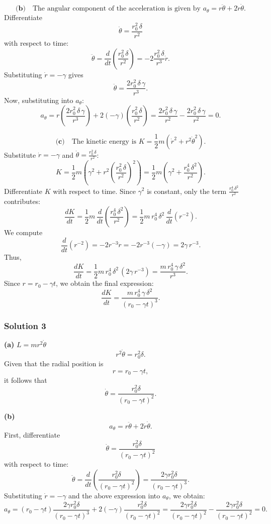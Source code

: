 \documentclass{article}
\begin{document}
\[
\textbf{(b)}\quad \text{The angular component of the acceleration is given by } a_\theta = r\ddot{\theta} + 2\dot{r}\dot{\theta}.
\]
Differentiate 
\[
\dot{\theta} = \frac{r_0^2\,\delta}{r^2}
\]
with respect to time:
\[
\ddot{\theta} = \frac{d}{dt}\left(\frac{r_0^2\,\delta}{r^2}\right) = -2\frac{r_0^2\,\delta}{r^3}\dot{r}.
\]
Substituting \(\dot{r} = -\gamma\) gives
\[
\ddot{\theta} = \frac{2r_0^2\,\delta\,\gamma}{r^3}.
\]
Now, substituting into \( a_\theta \):
\[
a_\theta = r\left(\frac{2r_0^2\,\delta\,\gamma}{r^3}\right) + 2(-\gamma)\left(\frac{r_0^2\,\delta}{r^2}\right)
= \frac{2r_0^2\,\delta\,\gamma}{r^2} - \frac{2r_0^2\,\delta\,\gamma}{r^2} = 0.
\]

\[
\textbf{(c)}\quad \text{The kinetic energy is }
K = \frac{1}{2}m\left(\dot{r}^2 + r^2\dot{\theta}^2\right).
\]
Substitute \(\dot{r} = -\gamma\) and \(\dot{\theta} = \frac{r_0^2\,\delta}{r^2}\):
\[
K = \frac{1}{2}m\left(\gamma^2 + r^2\left(\frac{r_0^2\,\delta}{r^2}\right)^2\right)
= \frac{1}{2}m\left(\gamma^2 + \frac{r_0^4\,\delta^2}{r^2}\right).
\]
Differentiate \( K \) with respect to time. Since \(\gamma^2\) is constant, only the term \(\frac{r_0^4\,\delta^2}{r^2}\) contributes:
\[
\frac{dK}{dt} = \frac{1}{2}m\,\frac{d}{dt}\left(\frac{r_0^4\,\delta^2}{r^2}\right)
= \frac{1}{2}m\,r_0^4\,\delta^2\,\frac{d}{dt}\left(r^{-2}\right).
\]
We compute
\[
\frac{d}{dt}\left(r^{-2}\right) = -2r^{-3}\dot{r} = -2r^{-3}(-\gamma) = 2\gamma\,r^{-3}.
\]
Thus,
\[
\frac{dK}{dt} = \frac{1}{2}m\,r_0^4\,\delta^2\,(2\gamma\,r^{-3})
= \frac{m\,r_0^4\,\gamma\,\delta^2}{r^3}.
\]
Since \( r = r_0 - \gamma t \), we obtain the final expression:
\[
\frac{dK}{dt} = \frac{m\,r_0^4\,\gamma\,\delta^2}{(r_0 - \gamma t)^3}.
\]


\subsubsection{Solution 3}
\textbf{(a)} \quad {} $ L = m r^2 \dot{\theta} $ 
\[
r^2 \dot{\theta} = r_0^2 \delta.
\]
Given that the radial position is 
\[
r = r_0 - \gamma t,
\]
it follows that
\[
\dot{\theta} = \frac{r_0^2 \delta}{(r_0 - \gamma t)^2}.
\]

\textbf{(b)} \quad {}
\[
a_{\theta} = r \ddot{\theta} + 2\dot{r}\dot{\theta}.
\]
First, differentiate 
\[
\dot{\theta} = \frac{r_0^2 \delta}{(r_0 - \gamma t)^2}
\]
with respect to time:
\[
\ddot{\theta} = \frac{d}{dt} \left(\frac{r_0^2 \delta}{(r_0 - \gamma t)^2}\right)
= \frac{2\gamma r_0^2 \delta}{(r_0 - \gamma t)^3}.
\]
Substituting \(\dot{r} = -\gamma\) and the above expression into \(a_{\theta}\), we obtain:
\[
a_{\theta} = (r_0-\gamma t) \frac{2\gamma r_0^2 \delta}{(r_0-\gamma t)^3} + 2(-\gamma)\frac{r_0^2 \delta}{(r_0-\gamma t)^2}
= \frac{2\gamma r_0^2 \delta}{(r_0-\gamma t)^2} - \frac{2\gamma r_0^2 \delta}{(r_0-\gamma t)^2} = 0.
\]
\end{document}
